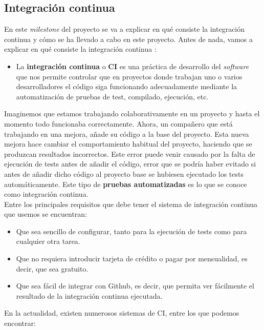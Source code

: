 \subsection{Integración continua}
En este \textit{milestone} del proyecto se va a explicar en qué consiste la integración
continua y cómo se ha llevado a cabo en este proyecto. Antes de nada, vamos a explicar en
qué consiste la integración continua \cite{continuous-integration}:

    \begin{itemize}
        \item La \textbf{integración continua} o \textbf{CI} es una práctica de desarrollo
        del \textit{software} que nos permite controlar que en proyectos donde trabajan uno
        o varios desarrolladores el código siga funcionando adecuadamente mediante la
        automatización de pruebas de test, compilado, ejecución, etc.
    \end{itemize}

Imaginemos que estamos trabajando colaborativamente en un proyecto y hasta el momento todo
funcionaba correctamente. Ahora, un compañero que está trabajando en una mejora, añade su
código a la base del proyecto. Esta nueva mejora hace cambiar el comportamiento habitual del
proyecto, haciendo que se produzcan resultados incorrectos. Este error puede venir causado
por la falta de ejecución de tests antes de añadir el código, error que se podría haber
evitado si antes de añadir dicho código al proyecto base se hubiesen ejecutado los tests
automáticamente. Este tipo de \textbf{pruebas automatizadas} es lo que se conoce como
integración continua.\\

\newpage Entre los principales requisitos que debe tener el sistema de integración continua que
usemos se encuentran:

    \begin{itemize}
        \item Que sea sencillo de configurar, tanto para la ejecución de tests como para
        cualquier otra tarea.
        \item Que no requiera introducir tarjeta de crédito o pagar por mensualidad, es
        decir, que sea gratuito.
        \item Que sea fácil de integrar con Github, es decir, que permita ver fácilmente el
        resultado de la integración continua ejecutada.
    \end{itemize}

En la actualidad, existen numerosos sistemas de CI, entre los que podemos encontrar:

